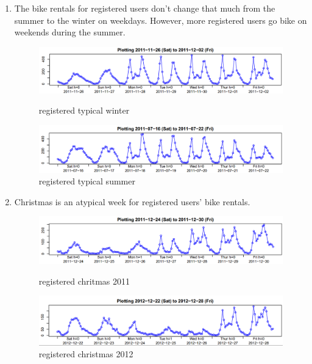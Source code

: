 \documentclass[12pt]{article}
\begin{document}
\begin{enumerate}
		 \item The bike rentals for registered users don't change that much from the summer to the winter on weekdays. However, more registered users go bike on weekends during the summer.
		 	\begin{figure}[H]
		 		\centering
		 		\begin{minipage}{.5\textwidth}
		 			\centering
		 			\includegraphics[width=\linewidth]{figures/registered_typical_winter.png}
		 			\caption{registered typical winter}
		 		\end{minipage}%
		 		\begin{minipage}{.5\textwidth}
		 			\centering
		 			\includegraphics[width=\linewidth]{figures/registered_typical_summer.png}
		 			\caption{registered typical summer}
		 		\end{minipage}
		 	\end{figure}
		 	
		\item Christmas is an atypical week for registered users' bike rentals. 
			 \begin{figure}[H]
			 	\centering
			 	\begin{minipage}{.5\textwidth}
			 		\centering
			 		\includegraphics[width=\linewidth]{figures/registered_christmas_2011.png}
			 		\caption{registered chritmas 2011}
			 	\end{minipage}%
			 	\begin{minipage}{.5\textwidth}
			 		\centering
			 		\includegraphics[width=\linewidth]{figures/registered_christmas_2012.png}
			 		\caption{registered christmas 2012}
			 	\end{minipage}
			 \end{figure}
		\end{enumerate}
		
\end{document}
